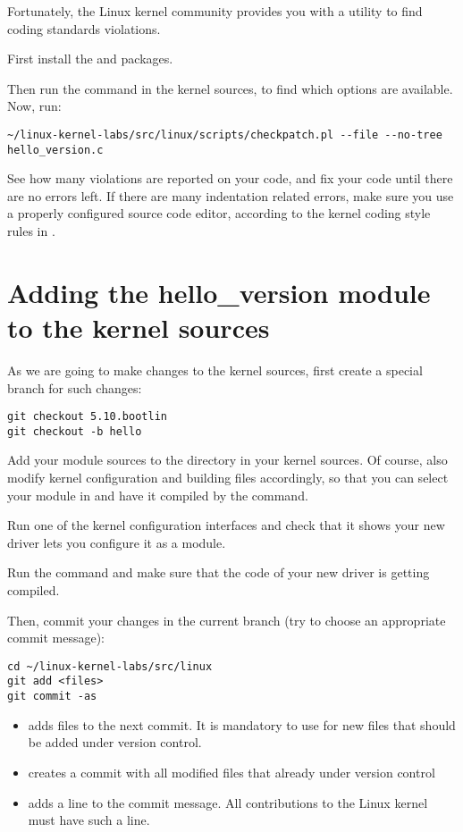 Fortunately, the Linux kernel community provides you with a utility to
find coding standards violations.

First install the  and  packages.

Then run the  command in the kernel sources,
to find which options are available.  Now, run:

\begin{verbatim}
~/linux-kernel-labs/src/linux/scripts/checkpatch.pl --file --no-tree hello_version.c
\end{verbatim}

See how many violations are reported on your code, and fix your code
until there are no errors left. If there are many indentation related
errors, make sure you use a properly configured source code editor,
according to the kernel coding style rules in
.

\section{Adding the hello\_version module to the kernel sources}

As we are going to make changes to the kernel sources, first create a
special branch for such changes:

\begin{verbatim}
git checkout 5.10.bootlin
git checkout -b hello
\end{verbatim}

Add your module sources to the  directory in your
kernel sources. Of course, also modify kernel configuration and
building files accordingly, so that you can select your module in
 and have it compiled by the  command.

Run one of the kernel configuration interfaces and check that it
shows your new driver lets you configure it as a module.

Run the  command and make sure that the code of your new
driver is getting compiled.

Then, commit your changes in the current branch (try to choose an
appropriate commit message):

\begin{verbatim}
cd ~/linux-kernel-labs/src/linux
git add <files>
git commit -as
\end{verbatim}

\begin{itemize}
\item {} adds files to the next commit. It is mandatory to
  use for new files that should be added under version control.
\item {} creates a commit with all modified files
  that already under version control
\item {} adds a  line to the
      commit message. All contributions to the Linux kernel must have
      such a line.
\end{itemize}


